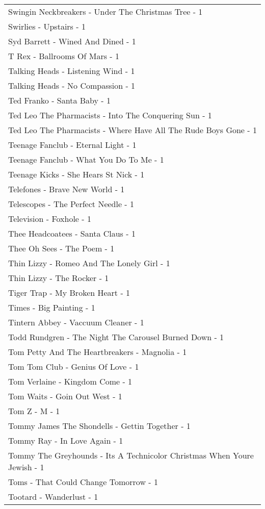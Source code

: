 \documentclass[
]{article}
\begin{document}
\begin{longtable}{l}
Swingin Neckbreakers - Under The Christmas Tree - 1 \\ 
Swirlies - Upstairs - 1 \\ 
Syd Barrett - Wined And Dined - 1 \\ 
T Rex - Ballrooms Of Mars - 1 \\ 
Talking Heads - Listening Wind - 1 \\ 
Talking Heads - No Compassion - 1 \\ 
Ted Franko - Santa Baby - 1 \\ 
Ted Leo The Pharmacists - Into The Conquering Sun - 1 \\ 
Ted Leo The Pharmacists - Where Have All The Rude Boys Gone - 1 \\ 
Teenage Fanclub - Eternal Light - 1 \\ 
Teenage Fanclub - What You Do To Me - 1 \\ 
Teenage Kicks - She Hears St Nick - 1 \\ 
Telefones - Brave New World - 1 \\ 
Telescopes - The Perfect Needle - 1 \\ 
Television - Foxhole - 1 \\ 
Thee Headcoatees - Santa Claus - 1 \\ 
Thee Oh Sees - The Poem - 1 \\ 
Thin Lizzy - Romeo And The Lonely Girl - 1 \\ 
Thin Lizzy - The Rocker - 1 \\ 
Tiger Trap - My Broken Heart - 1 \\ 
Times - Big Painting - 1 \\ 
Tintern Abbey - Vaccuum Cleaner - 1 \\ 
Todd Rundgren - The Night The Carousel Burned Down - 1 \\ 
Tom Petty And The Heartbreakers - Magnolia - 1 \\ 
Tom Tom Club - Genius Of Love - 1 \\ 
Tom Verlaine - Kingdom Come - 1 \\ 
Tom Waits - Goin Out West - 1 \\ 
Tom Z - M - 1 \\ 
Tommy James The Shondells - Gettin Together - 1 \\ 
Tommy Ray - In Love Again - 1 \\ 
Tommy The Greyhounds - Its A Technicolor Christmas When Youre Jewish - 1 \\ 
Toms - That Could Change Tomorrow - 1 \\ 
Tootard - Wanderlust - 1 \\ 

\end{longtable}
\end{document}
